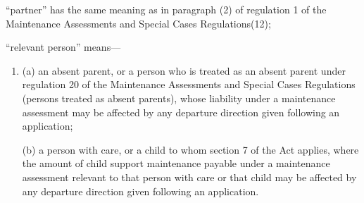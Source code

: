 \documentclass[a4paper]{article}
\begin{document}
\begin{enumerate}
“partner” has the same meaning as in paragraph (2) of regulation 1 of the
Maintenance Assessments and Special Cases Regulations(12);

“relevant person” means—
\begin{enumerate}\item[]
(a) an absent parent, or a person who is treated as an absent parent under
regulation 20 of the Maintenance Assessments and Special Cases Regulations
(persons treated as absent parents), whose liability under a maintenance
assessment may be affected by any departure direction given following an
application;

(b) a person with care, or a child to whom section 7 of the Act applies, where
the amount of child support maintenance payable under a maintenance assessment
relevant to that person with care or that child may be affected by any departure
direction given following an application.
\end{enumerate}
\end{enumerate}
\end{document}

